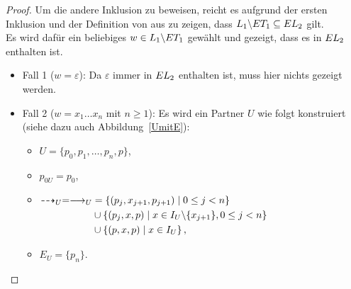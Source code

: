 \begin{proof}
  Um die andere Inklusion zu beweisen, reicht es aufgrund der ersten
  Inklusion und der Definition von \EL{} aus zu zeigen, dass $L_1\backslash ET
  _1\subseteq EL _2$ gilt.\\
  Es wird dafür ein beliebiges $w\in L_1\backslash ET _1$ gewählt und gezeigt,
  dass es in $EL _2$ enthalten ist.
  \begin{itemize}
    \item Fall 1 ($w=\varepsilon$): Da $\varepsilon$ immer in $EL _2$
      enthalten ist, muss hier nichts gezeigt werden.
    \item Fall 2 ($w=x_1\dots x_n$ mit $n\geq 1$): Es wird ein Partner $U$ wie
      folgt konstruiert (siehe dazu auch Abbildung~\ref{UmitE}):
      \begin{itemize}
        \item $U=\{p_0,p_1,\dots ,p_n,p\}$,
        \item $p_{0U}=p_0$,
        \item $\begin{aligned}[t]
            \may _U = \must _U&=\left\{(p_j,x_{j+1},p_{j+1})\mid 0\leq j<
            n\right\}\\
            &\cup\left\{(p_j,x,p)\mid x\in I_U\backslash\{x_{j+1}\},0\leq j<
            n\right\}\\
            &\cup\left\{(p,x,p)\mid x\in I_U\right\},
        \end{aligned}$
        \item $E_U=\{p_n\}$.
      \end{itemize}
      \begin{figure} [h!tbp]
      \begin{center}
\end{center}
\end{figure}
\end{itemize}
\end{proof}
